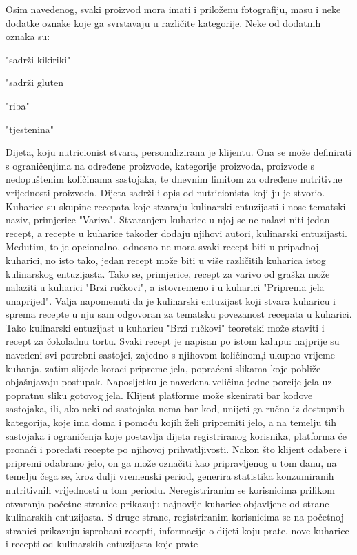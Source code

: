 	Osim navedenog, svaki proizvod mora imati i priloženu fotografiju, masu i neke dodatke oznake koje ga svrstavaju u različite kategorije. Neke od dodatnih oznaka su:
		\begin{packed_item}
			\item "sadrži kikiriki"
			\item "sadrži gluten
			\item "riba"
			\item "tjestenina"
		\end{packed_item}
	
	Dijeta, koju nutricionist stvara, personalizirana je klijentu. Ona se može definirati s ograničenjima na određene proizvode, kategorije proizvoda, proizvode s nedopuštenim količinama sastojaka, te dnevnim limitom za određene nutritivne vrijednosti proizvoda. Dijeta sadrži i opis od nutricionista koji ju je stvorio.
	Kuharice su skupine recepata koje stvaraju kulinarski entuzijasti i nose tematski naziv, primjerice "Variva". Stvaranjem kuharice u njoj se ne nalazi niti jedan recept, a recepte u kuharice također dodaju njihovi autori, kulinarski entuzijasti. Međutim, to je opcionalno, odnosno ne mora svaki recept biti u pripadnoj kuharici, no isto tako, jedan recept može biti u više različitih kuharica istog kulinarskog entuzijasta. Tako se, primjerice, recept za varivo od graška može nalaziti u kuharici "Brzi ručkovi", a istovremeno i u kuharici "Priprema jela unaprijed". Valja napomenuti da je kulinarski entuzijast koji stvara kuharicu i sprema recepte u nju sam odgovoran za tematsku povezanost recepata u kuharici. Tako kulinarski entuzijast u kuharicu "Brzi ručkovi" teoretski može staviti i recept za čokoladnu tortu.
	Svaki recept je napisan po istom kalupu: najprije su navedeni svi potrebni sastojci, zajedno s njihovom količinom,i ukupno vrijeme kuhanja, zatim slijede koraci pripreme jela, popraćeni slikama koje pobliže objašnjavaju postupak. Naposljetku je navedena veličina jedne porcije jela uz popratnu sliku gotovog jela.
	Klijent platforme može skenirati bar kodove sastojaka, ili, ako neki od sastojaka nema bar kod, unijeti ga ručno iz dostupnih kategorija, koje ima doma i pomoću kojih želi pripremiti jelo, a na temelju tih sastojaka i ograničenja koje postavlja dijeta registriranog korisnika, platforma će pronaći i poredati recepte po njihovoj prihvatljivosti. Nakon što klijent odabere i pripremi odabrano jelo, on ga može označiti kao pripravljenog u tom danu, na temelju čega se, kroz dulji vremenski period, generira statistika konzumiranih nutritivnih vrijednosti u tom periodu.
	Neregistriranim se korisnicima prilikom otvaranja početne stranice prikazuju najnovije kuharice objavljene od strane kulinarskih entuzijasta. S druge strane,  registriranim korisnicima se na početnoj stranici prikazuju isprobani recepti, informacije o dijeti koju prate, nove kuharice i recepti od kulinarskih entuzijasta koje prate
	
